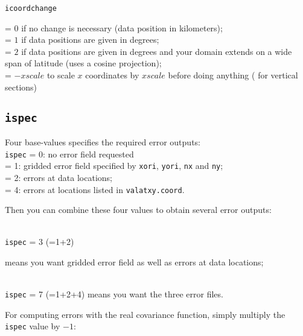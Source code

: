 \texttt{icoordchange} \begin{minipage}[t]{.7\textwidth} = $0$ if no change is necessary (data position in kilometers);\\
                                                        = $1$ if data positions are given in degrees;\\
                                                        = $2$ if data positions are given in degrees and your domain extends on a wide span of latitude                                                           (uses a cosine projection);\\
                                                        = $-xscale$ to scale $x$ coordinates by $xscale$ before doing anything ( for vertical                                                              sections)
                      \end{minipage}
                      
                      
\subsection{\texttt{ispec}}

Four base-values specifies the required error outputs:\\

\texttt{ispec}       = 0\qquad: no error field requested\\
  = 1\qquad: gridded error field specified by \texttt{xori}, \texttt{yori}, \texttt{nx} and \texttt{ny}; \\
  = 2\qquad: errors at data locations;\\
  = 4\qquad: errors at locations listed in \texttt{valatxy.coord}.

Then you can combine these four values to obtain several error outputs:

\examples\\
\texttt{ispec}             = 3 (=1+2)\hphantom{+4} \qquad \begin{minipage}[t]{.7\textwidth}means you want gridded error field as well as errors at data locations;\end{minipage}\\ 
\texttt{ispec}             = 7 (=1+2+4) \qquad means you want the three error files.


For computing errors with the real covariance function, %
simply multiply the \texttt{ispec} value by $-1$:

